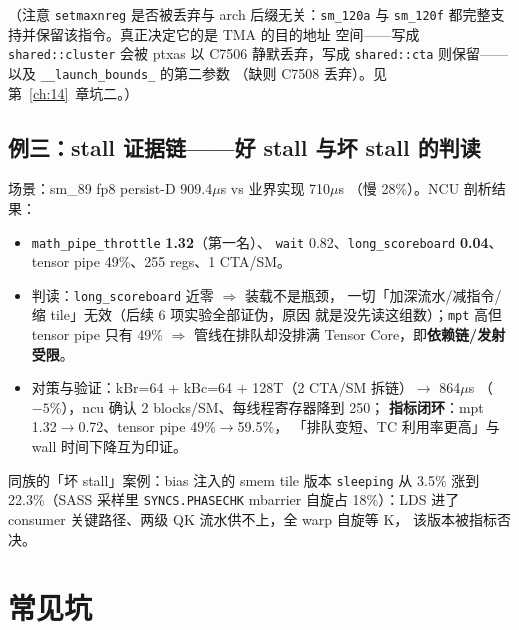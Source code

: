 （注意 \texttt{setmaxnreg} 是否被丢弃与 arch 后缀无关：\texttt{sm\_120a} 与
\texttt{sm\_120f} 都完整支持并保留该指令。真正决定它的是 TMA 的目的地址
空间——写成 \texttt{shared::cluster} 会被 ptxas 以 C7506 静默丢弃，写成
\texttt{shared::cta} 则保留——以及
\texttt{\_\allowbreak{}\_\allowbreak{}launch\_\allowbreak{}bounds\_\allowbreak{}} 的第二参数
（缺则 C7508 丢弃）。见第~\ref{ch:14}~章坑二。）

\subsection{例三：stall 证据链——好 stall 与坏 stall 的判读}

场景：sm\_89 fp8 persist-D 909.4$\mu$s vs 业界实现 710$\mu$s
（慢 28\%）。NCU 剖析结果：

\begin{itemize}
\item \texttt{math\_\allowbreak{}pipe\_\allowbreak{}throttle} \textbf{1.32}（第一名）、
  \texttt{wait} 0.82、\texttt{long\_\allowbreak{}scoreboard} \textbf{0.04}、tensor
  pipe 49\%、255 regs、1 CTA/SM。
\item 判读：\texttt{long\_\allowbreak{}scoreboard} 近零 $\Rightarrow$ 装载不是瓶颈，
  一切「加深流水/减指令/缩 tile」无效（后续 6 项实验全部证伪，原因
  就是没先读这组数）；\texttt{mpt} 高但 tensor pipe 只有 49\% $\Rightarrow$
  管线在排队却没排满 Tensor Core，即\textbf{依赖链/发射受限}。
\item 对策与验证：kBr=64 + kBc=64 + 128T（2 CTA/SM 拆链）$\to$ 864$\mu$s
  （$-5\%$），ncu 确认 2 blocks/SM、每线程寄存器降到 250；
  \textbf{指标闭环}：mpt 1.32$\to$0.72、tensor pipe 49\%$\to$59.5\%，
  「排队变短、TC 利用率更高」与 wall 时间下降互为印证。
\end{itemize}

同族的「坏 stall」案例：bias 注入的 smem tile 版本 \texttt{sleeping} 从
3.5\% 涨到 22.3\%（SASS 采样里 \texttt{SYNCS.\allowbreak{}PHASECHK} mbarrier 自旋占
18\%）：LDS 进了 consumer 关键路径、两级 QK 流水供不上，全 warp 自旋等 K，
该版本被指标否决。

\section{常见坑}

